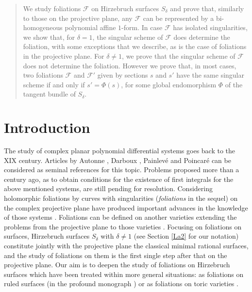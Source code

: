 \documentclass{amsart} %
\theoremstyle{definition}
\newcommand{\mcF}{\mathcal{F}}
\begin{document}
\begin{abstract}
We study foliations $\mathcal{F}$ on Hirzebruch surfaces $S_\delta$ and prove that, similarly
to those on the projective plane, any $\mathcal{F}$ can be represented by a bi-homogeneous
polynomial affine $1$-form. In case $\mathcal{F}$ has isolated singularities,
we show that, for $ \delta=1 $, the singular scheme of $ \mcF $
does determine the foliation, with some exceptions that we describe, as is the case of
foliations in the projective plane. For $ \delta \neq 1 $, we prove that
the singular scheme of $\mathcal{F}$  does not determine the foliation. However
we prove that, in most cases, two foliations $\mathcal{F}$
and $\mathcal{F}'$ given by sections $s$ and $s'$ have the same singular scheme if and only
if $ s' = \Phi( s )$, for some global endomorphism $ \Phi $ of the tangent bundle of $S_\delta$.
\end{abstract}
\maketitle
\section{Introduction}\label{La1}
The study of complex planar polynomial differential systems goes back to the XIX century.
Articles by Autonne \cite{aut}, Darboux \cite{dar}, Painlev\'e \cite{pai} and Poincar\'e
\cite{poi1, poi2} can be considered as seminal references for this topic. Problems proposed
more than a century ago, as to obtain conditions for the existence of first integrals for the
above mentioned systems, are still pending for resolution. Considering holomorphic foliations
by curves with singularities (\textit{foliations} in the sequel) on the complex projective
plane have produced important advances in the knowledge of those systems \cite{ce-li,car,ca-ca,zam1,pere,l-n,es-kl,g-m-1,g-m-2,g-m-3,FGM}. Foliations can be defined
on another varieties extending the problems from the projective plane to those varieties
\cite{soa1, jou2,soa2, zam2, c-l, Correa}. Focusing on foliations on surfaces, Hirzebruch surfaces
$S_{\delta}$ with $\delta \neq 1$ (see Section \ref{La2} for our notation)
constitute jointly with the projective plane the
classical minimal rational surfaces, and the study of foliations on them is the first single step
after that on the projective plane. Our aim is to deepen the study of foliations
on Hirzebruch surfaces which have been treated within more general situations: as foliations
on ruled surfaces (in the profound monograph \cite{Gomez-Mont}) or as foliations
on toric varieties \cite{Correa}.
\end{document}
